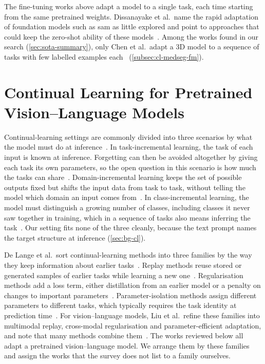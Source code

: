 The fine-tuning works above adapt a model to a single task, each time starting from the same pretrained weights.
Dissanayake et al.\ name the rapid adaptation of foundation models such as \gls{sam} as little explored and point to approaches that could keep the zero-shot ability of these models~\cite[Sec.~5.6]{theekshana26fewshot}.
Among the works found in our search (\cref{sec:sota-summary}), only Chen et al.\ adapt a 3D model to a sequence of tasks with few labelled examples each~\cite{chen2026fewshotcontinuallearning3d} (\cref{subsec:cl-medseg-fm}).

\section[Continual Learning for Pretrained Vision--Language Models]{Continual Learning for Pretrained\texorpdfstring{\newline}{ } Vision--Language Models}
\label{sec:cl-vlm}

Continual-learning settings are commonly divided into three scenarios by what the model must do at inference~\cite{van_de_Ven_2025}.
In task-incremental learning, the task of each input is known at inference.
Forgetting can then be avoided altogether by giving each task its own parameters, so the open question in this scenario is how much the tasks can share~\cite{van_de_Ven_2025}.
Domain-incremental learning keeps the set of possible outputs fixed but shifts the input data from task to task, without telling the model which domain an input comes from~\cite{van_de_Ven_2025}.
In class-incremental learning, the model must distinguish a growing number of classes, including classes it never saw together in training, which in a sequence of tasks also means inferring the task~\cite{van_de_Ven_2025}.
Our setting fits none of the three cleanly, because the text prompt names the target structure at inference (\cref{sec:bg-cl}).

De Lange et al.\ sort continual-learning methods into three families by the way they keep information about earlier tasks~\cite[Sec.~3]{delange2022}.
Replay methods reuse stored or generated samples of earlier tasks while learning a new one~\cite[Sec.~3.1]{delange2022}.
Regularisation methods add a loss term, either distillation from an earlier model or a penalty on changes to important parameters~\cite[Sec.~3.2]{delange2022}.
Parameter-isolation methods assign different parameters to different tasks, which typically requires the task identity at prediction time~\cite[Sec.~3.3]{delange2022}.
For vision--language models, Liu et al.\ refine these families into multimodal replay, cross-modal regularisation and parameter-efficient adaptation, and note that many methods combine them~\cite[Sec.~4]{liu2026continuallearningvlmssurvey}.
The works reviewed below all adapt a pretrained vision--language model.
We arrange them by these families and assign the works that the survey does not list to a family ourselves.

